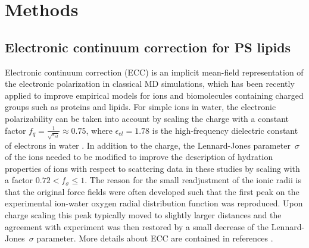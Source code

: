\documentclass[journal=jctcce,manuscript=article]{achemso}
\begin{document}
\section{Methods} 
 
\subsection{Electronic continuum correction for PS lipids}\label{section:ecc} 

Electronic continuum correction (ECC) is an implicit mean-field representation of 
the electronic polarization in classical MD simulations, 
which has been recently applied to improve empirical models for ions and
 biomolecules containing charged groups such as proteins and lipids. 
\cite{melcr18, Pluharova2014, martinek17, duboue2018insulin, Mason2019, Duboue2018MgZn}
For simple ions in water, the electronic polarizability
can be taken into account by scaling the charge with a constant factor 
 \mbox{$ f_q = \frac{1}{\sqrt{\epsilon_{el}}} \approx 0.75$,}
where  $\epsilon_{el} = 1.78$ is the high-frequency dielectric constant of electrons in water \cite{leontyev09}.
In addition to the charge, the Lennard-Jones parameter~$\sigma$ of the ions needed to be modified 
to improve the description of hydration properties of ions with respect to scattering data in these studies 
by scaling with a factor $ 0.72 < f_\sigma \leq 1$.
The reason for the small readjustment of the ionic radii is that the original force fields were often developed such that the first peak on the experimental ion-water oxygen radial distribution function was reproduced. 
Upon charge scaling this peak typically moved to slightly larger distances and the agreement with experiment was then restored by a small decrease of the Lennard-Jones~$\sigma$ parameter.
More details about ECC are contained in references . 
\end{document}
